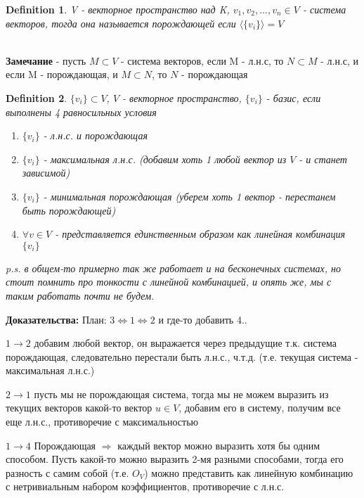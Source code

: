 \documentclass[12pt]{article}
\newtheorem{definition}{Definition}
\begin{document}
\begin{definition}
    V - векторное пространство над K, $v_1, v_2, ..., v_n \in V$ - система векторов, тогда она называется порождающей если $\langle\{v_i\} \rangle =V$
\end{definition} 
\\

\textbf{Замечание} - пусть $M \subset V$ - система векторов, если M - л.н.с, то $N \subset M$ - л.н.с, и если M - порождающая, и $M \subset N$, то $N$ - порождающая
\\

\begin{definition}
    $\{v_i\} \subset V$, $V$ - векторное пространство, $\{v_i\}$ - базис, если выполнены 4 равносильных условия
    \begin{enumerate}
        \item $\{v_i\}$ - л.н.с. и порождающая
        \item $\{v_i\}$ - максимальная л.н.с. (добавим хоть 1 любой вектор из $V$ - и станет зависимой)
        \item $\{v_i\}$ - минимальная порождающая (уберем хоть 1 вектор - перестанем быть порождающей)
        \item $\forall v \in V$ - представляется единственным образом как линейная комбинация $\{v_i\}$ 
    \end{enumerate}
    p.s. в общем-то примерно так же работает и на бесконечных системах, но стоит помнить про тонкости с линейной комбинацией, и опять же, мы с таким работать почти не будем.

\end{definition} 

\textbf{Доказательства:} План: $3 \Leftrightarrow 1 \Leftrightarrow 2$ и где-то добавить 4..

$1 \rightarrow 2$ добавим любой вектор, он выражается через предыдущие т.к. система порождающая, следовательно перестали быть л.н.с., ч.т.д. (т.е. текущая система - максимальная л.н.с.)

$2 \rightarrow 1$ пусть мы не порождающая система, тогда мы не можем выразить из текущих векторов какой-то вектор $u \in V$, добавим его в систему, получим все еще л.н.с., противоречие с максимальностью

$1 \rightarrow 4$ Порождающая $\Rightarrow$ каждый вектор можно выразить хотя бы одним способом. Пусть какой-то можно выразить 2-мя разными способами, тогда его разность с самим собой (т.е. $O_V$) можно представить как линейную комбинацию с нетривиальным набором коэффициентов, противоречие с л.н.с.
\end{document}
